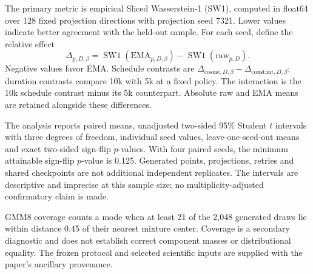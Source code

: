 The primary metric is empirical Sliced Wasserstein-1 (SW1), computed in
float64 over 128 fixed projection directions with projection seed 7321.
Lower values indicate better agreement with the held-out sample. For each
seed, define the relative effect
\begin{equation}
\Delta_{p,D,\beta}=\operatorname{SW1}(\mathrm{EMA}_{p,D,\beta})
                   -\operatorname{SW1}(\mathrm{raw}_{p,D}).
\end{equation}
Negative values favor EMA. Schedule contrasts are
$\Delta_{\mathrm{cosine},D,\beta}-\Delta_{\mathrm{constant},D,\beta}$;
duration contrasts compare 10k with 5k at a fixed policy. The interaction is
the 10k schedule contrast minus its 5k counterpart. Absolute raw and EMA
means are retained alongside these differences.

The analysis reports paired means, unadjusted two-sided 95\% Student $t$
intervals with three degrees of freedom, individual seed values,
leave-one-seed-out means and exact two-sided sign-flip $p$-values. With four
paired seeds, the minimum attainable sign-flip $p$-value is 0.125. Generated
points, projections, retries and shared checkpoints are not additional
independent replicates. The intervals are descriptive and imprecise at this
sample size; no multiplicity-adjusted confirmatory claim is made.

GMM8 coverage counts a mode when at least 21 of the 2,048 generated draws
lie within distance 0.45 of their nearest mixture center. Coverage is a
secondary diagnostic and does not establish correct component masses or
distributional equality. The frozen protocol and selected scientific inputs
are supplied with the paper's ancillary provenance.
